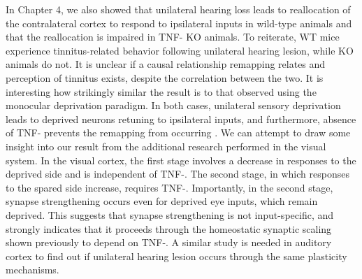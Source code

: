 In Chapter 4, we also showed that unilateral hearing loss leads to reallocation of the contralateral cortex to respond to ipsilateral inputs in wild-type animals and that the reallocation is impaired in TNF-\textalpha{} KO animals. To reiterate, WT mice experience tinnitus-related behavior following unilateral hearing lesion, while KO animals do not. It is unclear if a causal relationship remapping relates and perception of tinnitus exists, despite the correlation between the two. It is interesting how strikingly similar the result is to that observed using the monocular deprivation paradigm. In both cases, unilateral sensory deprivation leads to deprived neurons retuning to ipsilateral inputs, and furthermore, absence of TNF-\textalpha{} prevents the remapping from occurring \cite{Mrsic-Flogel2007, Kaneko2008}. We can attempt to draw some insight into our result from the additional research performed in the visual system. In the visual cortex, the first stage involves a decrease in responses to the deprived side and is independent of TNF-\textalpha{}. The second stage, in which responses to the spared side increase, requires TNF-\textalpha{}. Importantly, in the second stage, synapse strengthening occurs even for deprived eye inputs, which remain deprived. This suggests that synapse strengthening is not input-specific, and strongly indicates that it proceeds through the homeostatic synaptic scaling shown previously to depend on TNF-\textalpha{}. A similar study is needed in auditory cortex to find out if unilateral hearing lesion occurs through the same plasticity mechanisms.

